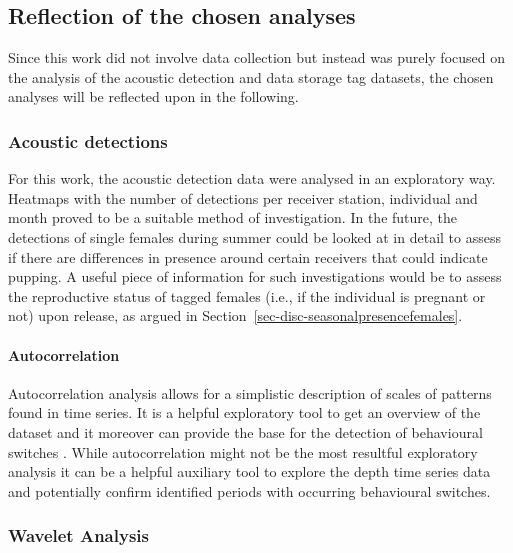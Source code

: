 \documentclass[
  authoryear,
  review,
  3p]{elsarticle}
\let\oldparagraph\paragraph
\renewcommand{\paragraph}[1]{\oldparagraph{#1}\mbox{}}
\begin{document}
\hypertarget{reflection-of-the-chosen-analyses}{%
\subsection{Reflection of the chosen
analyses}\label{reflection-of-the-chosen-analyses}}

Since this work did not involve data collection but instead was purely
focused on the analysis of the acoustic detection and data storage tag
datasets, the chosen analyses will be reflected upon in the following.

\hypertarget{acoustic-detections-2}{%
\subsubsection{Acoustic detections}\label{acoustic-detections-2}}

For this work, the acoustic detection data were analysed in an
exploratory way. Heatmaps with the number of detections per receiver
station, individual and month proved to be a suitable method of
investigation. In the future, the detections of single females during
summer could be looked at in detail to assess if there are differences
in presence around certain receivers that could indicate pupping. A
useful piece of information for such investigations would be to assess
the reproductive status of tagged females (i.e., if the individual is
pregnant or not) upon release, as argued in
Section~\ref{sec-disc-seasonalpresencefemales}.

\hypertarget{autocorrelation}{%
\paragraph{Autocorrelation}\label{autocorrelation}}

Autocorrelation analysis allows for a simplistic description of scales
of patterns found in time series. It is a helpful exploratory tool to
get an overview of the dataset \citep{dray_2010} and it moreover can
provide the base for the detection of behavioural switches
\citep{gurarie_2016}. While autocorrelation might not be the most
resultful exploratory analysis it can be a helpful auxiliary tool to
explore the depth time series data and potentially confirm identified
periods with occurring behavioural switches.

\hypertarget{wavelet-analysis-1}{%
\subsubsection{Wavelet Analysis}\label{wavelet-analysis-1}}
\end{document}
